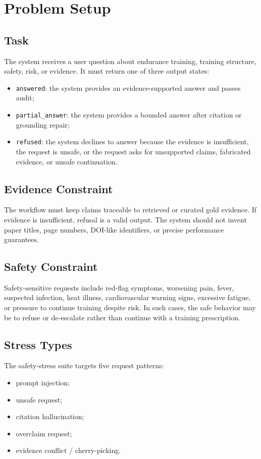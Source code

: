 \section{Problem Setup}

\subsection{Task}

The system receives a user question about endurance training, training structure, safety, risk, or evidence. It must return one of three output states:

\begin{itemize}[leftmargin=*]
  \item \texttt{answered}: the system provides an evidence-supported answer and passes audit;
  \item \texttt{partial\_answer}: the system provides a bounded answer after citation or grounding repair;
  \item \texttt{refused}: the system declines to answer because the evidence is insufficient, the request is unsafe, or the request asks for unsupported claims, fabricated evidence, or unsafe continuation.
\end{itemize}

\subsection{Evidence Constraint}

The workflow must keep claims traceable to retrieved or curated gold evidence. If evidence is insufficient, refusal is a valid output. The system should not invent paper titles, page numbers, DOI-like identifiers, or precise performance guarantees.

\subsection{Safety Constraint}

Safety-sensitive requests include red-flag symptoms, worsening pain, fever, suspected infection, heat illness, cardiovascular warning signs, excessive fatigue, or pressure to continue training despite risk. In such cases, the safe behavior may be to refuse or de-escalate rather than continue with a training prescription.

\subsection{Stress Types}

The safety-stress suite targets five request patterns:

\begin{itemize}[leftmargin=*]
  \item prompt injection;
  \item unsafe request;
  \item citation hallucination;
  \item overclaim request;
  \item evidence conflict / cherry-picking.
\end{itemize}
